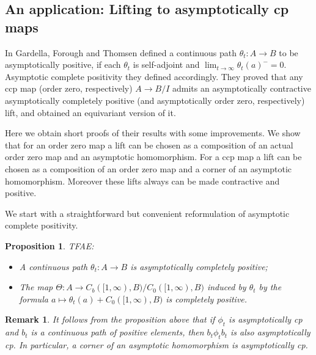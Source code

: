 \documentclass{article}%
\newtheorem{proposition}[theorem]{Proposition}
\newtheorem{remark}[theorem]{Remark}
\begin{document}
\subsection{An application: Lifting to asymptotically cp maps}



In \cite{FGT} Gardella, Forough and Thomsen defined a continuous path $\theta_t:A \to B$ to be asymptotically positive, if each $\theta_t$  is self-adjoint and $\lim_{t\to \infty}\theta_t(a)^- = 0$. Asymptotic complete positivity they defined accordingly. They proved that any ccp map (order zero, respectively) $A\to B/I$ admits an asymptotically contractive asymptotically completely positive (and asymptotically order zero, respectively) lift, and obtained an equivariant version of it.

Here we obtain short proofs of their results with some improvements. We show that for an order zero map a lift can be chosen as a composition of an actual order zero map and an asymptotic homomorphism. For a ccp map a lift can be chosen as a composition of an order zero map and a corner of an asymptotic homomorphism. Moreover these lifts always can be made contractive and positive.

We start with a straightforward but convenient reformulation of asymptotic complete positivity.

\begin{proposition} TFAE:
\begin{itemize}
\item A continuous path $\theta_t:A \to B$ is asymptotically completely positive;

\item The map $\Theta: A \to C_b([1, \infty), B)/C_0([1, \infty), B)$ induced by $\theta_t$ by the formula $a\mapsto \theta_t(a) + C_0([1, \infty), B)$ is completely positive.
\end{itemize}
\end{proposition}

\begin{remark}\label{ascpNew} It follows from the proposition above that if $\phi_t$ is asymptotically cp and $b_t$ is a continuous path of positive elements, then $b_t\phi_tb_t$ is also asymptotically cp. In particular, a corner of an asymptotic homomorphism is asymptotically cp.
\end{remark}
\end{document}
